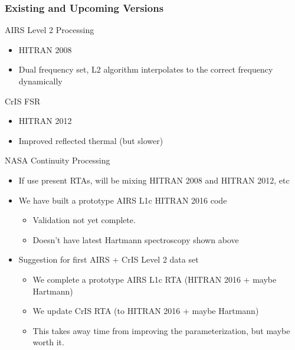 \documentclass[10pt,t]{beamer}
\begin{document}
\begin{frame}[shrink=20]
  \frametitle{Existing and Upcoming Versions}

  \begin{block}{AIRS Level 2 Processing}
    \begin{itemize}
    \item HITRAN 2008
    \item Dual frequency set, L2 algorithm interpolates to the correct frequency  dynamically 
     \end{itemize}
  \end{block}
  \begin{block}{CrIS FSR}
    \begin{itemize}
    \item HITRAN 2012
    \item Improved reflected thermal (but slower)
     \end{itemize}
  \end{block}
  \begin{block}{NASA Continuity Processing}
    \begin{itemize}
    \item If use present RTAs, will be mixing HITRAN 2008 and HITRAN 2012, etc
    \item We have built a prototype AIRS L1c HITRAN 2016 code
      \begin{itemize}
      \item Validation not yet complete.
      \item Doesn't have latest Hartmann spectroscopy shown above
      \end{itemize}
    \item Suggestion for first AIRS + CrIS Level 2 data set
      \begin{itemize}
      \item We complete a prototype AIRS L1c RTA (HITRAN 2016 + maybe Hartmann)
      \item We update CrIS RTA (to HITRAN 2016 + maybe Hartmann)
      \item This takes away time from improving the parameterization, but maybe worth it.
      \end{itemize}
  
      

    \end{itemize}
  \end{block}
  
  
\end{frame}
\end{document}
